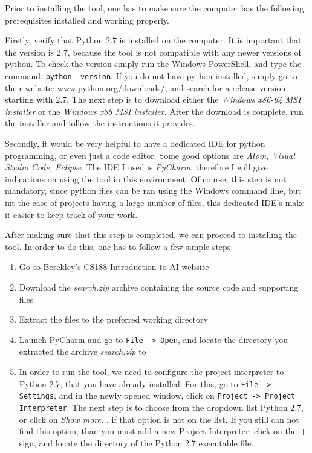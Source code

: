 \documentclass[a4paper,12pt]{report}
\begin{document}
Prior to installing the tool, one has to make sure the computer has the following prerequisites installed and working properly.

\label{l:requierements}
Firstly, verify that Python 2.7 is installed on the computer. It is important that the version is 2.7, because the tool is not compatible with any newer versions of python. To check the version simply run the Windows PowerShell, and type the command: \texttt{python --version}. If you do not have python installed, simply go to their website: \href{https://www.python.org/downloads/}{www.python.org/downloads/}, and search for a release version starting with 2.7. The next step is to download either the \textit{Windows x86-64 MSI installer} or the \textit{Windows x86 MSI installer}. After the download is complete, run the installer and follow the instructions it provides.

Secondly, it would be very helpful to have a dedicated IDE for python programming, or even just a code editor. Some good options are \textit{Atom, Visual Studio Code, Eclipse}. The IDE I used is \textit{PyCharm}, therefore I will give indications on using the tool in this environment. Of course, this step is not mandatory, since python files can be ran using the Windows command line, but int the case of projects having a large number of files, this dedicated IDE's make it easier to keep track of your work.

After making sure that this step is completed, we can proceed to installing the tool. In order to do this, one has to follow a few simple steps:

\begin{enumerate}
\item Go to Berekley's CS188 Introduction to AI \href{http://ai.berkeley.edu/search.html}{website}
\item Download the \textit{search.zip} archive containing the source code and supporting files
\item Extract the files to the preferred working directory
\item Launch PyCharm and go to \texttt{File -> Open}, and locate the directory you extracted the archive \textit{search.zip} to
\item In order to run the tool, we need to configure the project interpreter to Python 2.7, that you have already installed. For this, go to \texttt{File -> Settings}, and in the newly opened window, click on \texttt{Project -> Project Interpreter}. The next step is to choose from the dropdown list Python 2.7, or click on \textit{Show more...} if that option is not on the list. If you still can not find this option, than you must add a new Project Interpreter: click on the \textbf{+} sign, and locate the directory of the Python 2.7 executable file. 
\end{enumerate}
\end{document}
